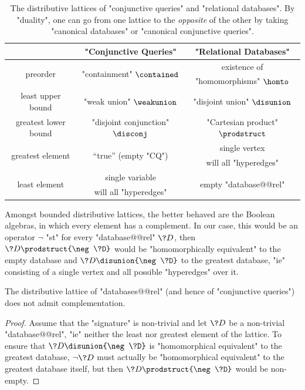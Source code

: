\begin{table}
	\centering
	\begin{tabular}{ccc}
		\toprule
		 & "Conjunctive Queries" & "Relational Databases" \\ \midrule
		\multirow{2}{*}{preorder} & \multirow{2}{*}{"containment" $\contained$} & existence of\\
		& & "homomorphisms" $\homto$ \\
		least upper bound & "weak union" $\weakunion$ & "disjoint union" $\disunion$ \\
		greatest lower bound & "disjoint conjunction" $\disconj$ & "Cartesian product" $\prodstruct$ \\ 
		\multirow{2}{*}{greatest element} & \multirow{2}{*}{``true'' (empty "CQ")} & single vertex \\
		& & will all "hyperedges" \\
		\multirow{2}{*}{least element} & single variable & \multirow{2}{*}{empty "database@@rel"}
		\\
		& will all "hyperedges" & \\ \bottomrule
	\end{tabular}
	\caption{
		\AP\label{tab:distributive-lattices}
		The distributive lattices of "conjunctive queries" and "relational databases".
		By "duality", one can go from one lattice to the \emph{opposite} of the other
		by taking "canonical databases" or "canonical conjunctive queries".}
\end{table}

Amongst bounded distributive lattices, the better behaved are
the Boolean algebras, in which every element has a complement.
In our case, this would be an operator $\neg$ "st" for every "database@@rel" $\?D$,
then $\?D \prodstruct {\neg \?D}$ would be "homomorphically equivalent" to
the empty database and $\?D \disunion {\neg \?D}$ to the greatest database,
"ie" consisting of a single vertex and all possible "hyperedges" over it.

\begin{proposition}
	The distributive lattice of "databases@@rel" (and hence of
	"conjunctive queries") does not admit complementation.
\end{proposition}

\begin{proof}
	Assume that the "signature" is non-trivial and let $\?D$ be a non-trivial "database@@rel",
	"ie" neither the least nor greatest element of the lattice.
	To ensure that $\?D \disunion {\neg \?D}$ is "homomorphical equivalent"
	to the greatest database, $\neg \?D$ must actually be "homomorphical equivalent" to 
	the greatest database itself,
	but then $\?D \prodstruct {\neg \?D}$ would be non-empty.
\end{proof}

